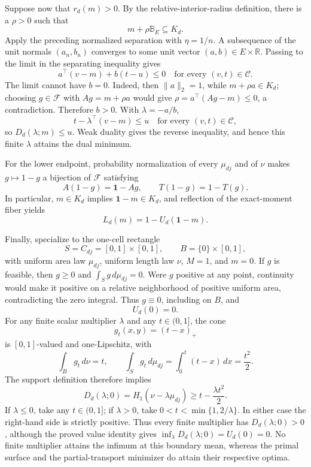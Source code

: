 Suppose now that \(r_d(m)>0\).  By the relative-interior-radius definition, there is a \(\rho>0\) such that
\[
 m+\rho\mathbb B_E\subseteq K_d.
\]
Apply the preceding normalized separation with \(\eta=1/n\).  A subsequence of the unit normals \((a_n,b_n)\) converges to some unit vector \((a,b)\in E\times\mathbb R\).  Passing to the limit in the separating inequality gives
\[
 a^\top(v-m)+b(t-u)\leq0
 \quad\text{for every }(v,t)\in\mathcal C.
\]
The limit cannot have \(b=0\).  Indeed, then \(\lVert a\rVert_2=1\), while \(m+\rho a\in K_d\); choosing \(g\in\mathcal F\) with \(Ag=m+\rho a\) would give \(\rho=a^\top(Ag-m)\leq0\), a contradiction.  Therefore \(b>0\).  With \(\lambda=-a/b\),
\[
 t-\lambda^\top(v-m)\leq u
 \quad\text{for every }(v,t)\in\mathcal C,
\]
so \(D_d(\lambda;m)\leq u\).  Weak duality gives the reverse inequality, and hence this finite \(\lambda\) attains the dual minimum.

For the lower endpoint, probability normalization of every \(\mu_{dj}\) and of \(\nu\) makes \(g\mapsto1-g\) a bijection of \(\mathcal F\) satisfying
\[
 A(1-g)=\mathbf 1-Ag,
 \qquad
 T(1-g)=1-T(g).
\]
In particular, \(m\in K_d\) implies \(\mathbf1-m\in K_d\), and reflection of the exact-moment fiber yields
\[
 L_d(m)=1-U_d(\mathbf1-m).
\]

Finally, specialize to the one-cell rectangle
\[
 S=C_{dj}=[0,1]\times[0,1],
 \qquad
 B=\{0\}\times[0,1],
\]
with uniform area law \(\mu_{dj}\), uniform length law \(\nu\), \(M=1\), and \(m=0\).  If \(g\) is feasible, then \(g\geq0\) and \(\int_Sg\,d\mu_{dj}=0\).  Were \(g\) positive at any point, continuity would make it positive on a relative neighborhood of positive uniform area, contradicting the zero integral.  Thus \(g\equiv0\), including on \(B\), and
\[
 U_d(0)=0.
\]
For any finite scalar multiplier \(\lambda\) and any \(t\in(0,1]\), the cone
\[
 g_t(x,y)=(t-x)_+
\]
is \([0,1]\)-valued and one-Lipschitz, with
\[
 \int_Bg_t\,d\nu=t,
 \qquad
 \int_Sg_t\,d\mu_{dj}
 =\int_0^t(t-x)\,dx
 =\frac{t^2}{2}.
\]
The support definition therefore implies
\[
 D_d(\lambda;0)=H_1(\nu-\lambda\mu_{dj})
 \geq t-\frac{\lambda t^2}{2}.
\]
If \(\lambda\leq0\), take any \(t\in(0,1]\); if \(\lambda>0\), take \(0<t<\min\{1,2/\lambda\}\).  In either case the right-hand side is strictly positive.  Thus every finite multiplier has \(D_d(\lambda;0)>0\), although the proved value identity gives \(\inf_\lambda D_d(\lambda;0)=U_d(0)=0\).  No finite multiplier attains the infimum at this boundary mean, whereas the primal surface and the partial-transport minimizer do attain their respective optima.
